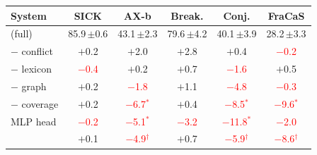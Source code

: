 \begin{tabular*}{\textwidth}{@{\extracolsep{\fill}}lccccc@{}}
\toprule
System & SICK & AX-b & Break. & Conj. & FraCaS \\
\midrule
\model{} (full) & 85.9\,{\tiny$\pm$0.6} & 43.1\,{\tiny$\pm$2.3} & 79.6\,{\tiny$\pm$4.2} & 40.1\,{\tiny$\pm$3.9} & 28.2\,{\tiny$\pm$3.3} \\
$-$ conflict & $+$0.2 & $+$2.0 & $+$2.8 & $+$0.4 & \textcolor{red}{$-$0.2} \\
$-$ lexicon & \textcolor{red}{$-$0.4} & $+$0.2 & $+$0.7 & \textcolor{red}{$-$1.6} & $+$0.5 \\
$-$ graph & $+$0.2 & \textcolor{red}{$-$1.8} & $+$1.1 & \textcolor{red}{$-$4.8} & \textcolor{red}{$-$0.3} \\
$-$ coverage & $+$0.2 & \textcolor{red}{$-$6.7$^{*}$} & $+$0.4 & \textcolor{red}{$-$8.5$^{*}$} & \textcolor{red}{$-$9.6$^{*}$} \\
MLP head & \textcolor{red}{$-$0.2} & \textcolor{red}{$-$5.1$^{*}$} & \textcolor{red}{$-$3.2} & \textcolor{red}{$-$11.8$^{*}$} & \textcolor{red}{$-$2.0} \\
\midrule
\cls{} & $+$0.1 & \textcolor{red}{$-$4.9$^{\dagger}$} & $+$0.7 & \textcolor{red}{$-$5.9$^{\dagger}$} & \textcolor{red}{$-$8.6$^{\dagger}$} \\
\bottomrule
\end{tabular*}
